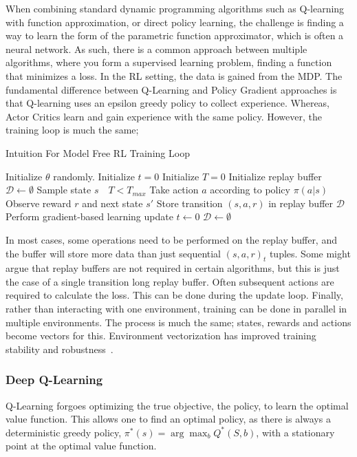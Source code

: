 When combining standard dynamic programming algorithms such as Q-learning with function approximation, or direct policy learning, the challenge is finding a way to learn the form of the parametric function approximator, which is often a neural network. As such, there is a common approach between multiple algorithms, where you form a supervised learning problem, finding a function that minimizes a loss. In the RL setting, the data is gained from the MDP. The fundamental difference between Q-Learning and Policy Gradient approaches is that Q-learning uses an epsilon greedy policy to collect experience. Whereas, Actor Critics learn and gain experience with the same policy. However, the training loop is much the same;

\begin{algorithm}
	\caption{Intuition For Model Free RL Training Loop}
	\begin{algorithmic}
		\State Initialize $\theta$ randomly.
		\State Initialize $t=0$
		\State Initialize $T=0$
		\State Initialize replay buffer $\mathcal{D} \leftarrow \emptyset$
		\State Sample state $s$
		\While $\text{ }T < T_{max}$
		\State Take action $a$ according to policy $\pi(a|s)$
		\State Observe reward $r$ and next state $s'$
		\State Store transition $(s, a, r)$ in replay buffer $\mathcal{D}$
		\State Perform gradient-based learning update
		\State $t \leftarrow 0$
		\State $\mathcal{D} \leftarrow \emptyset$
		\EndIf

		\EndWhile

	\end{algorithmic}
\end{algorithm}
In most cases, some operations need to be performed on the replay buffer, and the buffer will store more data than just sequential $(s, a,r)_t$ tuples. Some might argue that replay buffers are not required in certain algorithms, but this is just the case of a single transition long replay buffer. Often subsequent actions are required to calculate the loss. This can be done during the update loop. Finally, rather than interacting with one environment, training can be done in parallel in multiple environments. The process is much the same; states, rewards and actions become vectors for this. Environment vectorization has improved training stability and robustness~\cite{minh2016asynchronous}.

\subsubsection{Deep Q-Learning}\label{sec:Q-learning}
Q-Learning forgoes optimizing the true objective, the policy, to learn the optimal value function. This allows one to find an optimal policy, as there is always a deterministic greedy policy, $\pi^*(s) = \arg \max_{b} Q^*(S, b)$, with a stationary point at the optimal value function.

